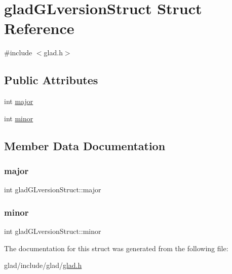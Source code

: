 \hypertarget{structglad_g_lversion_struct}{}\section{glad\+G\+Lversion\+Struct Struct Reference}
\label{structglad_g_lversion_struct}


{\ttfamily \#include $<$glad.\+h$>$}

\subsection*{Public Attributes}
\begin{DoxyCompactItemize}
\item 
int \mbox{\hyperlink{structglad_g_lversion_struct_ac7f9db11d2679df12ef0313b728554db}{major}}
\item 
int \mbox{\hyperlink{structglad_g_lversion_struct_acc2bff1c8966c6866f2ad6f5a4e475b2}{minor}}
\end{DoxyCompactItemize}


\subsection{Member Data Documentation}
\mbox{\label{structglad_g_lversion_struct_ac7f9db11d2679df12ef0313b728554db}} 
\subsubsection{\texorpdfstring{major}{major}}
{\footnotesize\ttfamily int glad\+G\+Lversion\+Struct\+::major}

\mbox{\label{structglad_g_lversion_struct_acc2bff1c8966c6866f2ad6f5a4e475b2}} 
\subsubsection{\texorpdfstring{minor}{minor}}
{\footnotesize\ttfamily int glad\+G\+Lversion\+Struct\+::minor}



The documentation for this struct was generated from the following file\+:\begin{DoxyCompactItemize}
\item 
glad/include/glad/\mbox{\hyperlink{glad_8h}{glad.\+h}}\end{DoxyCompactItemize}
